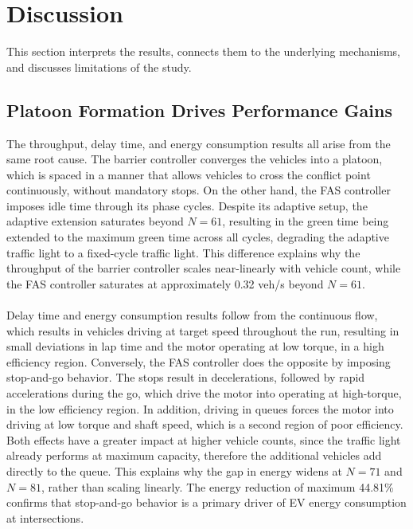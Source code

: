 \section{Discussion}
\label{Discussion}
This section interprets the results, connects them to the underlying mechanisms, and discusses limitations of the study.

\subsection{Platoon Formation Drives Performance Gains}
The throughput, delay time, and energy consumption results all arise from the same root cause. The barrier controller converges the vehicles into a platoon, which is spaced in a manner that allows vehicles to cross the conflict point continuously, without mandatory stops. On the other hand, the FAS controller imposes idle time through its phase cycles. Despite its adaptive setup, the adaptive extension saturates beyond \(N=61\), resulting in the green time being extended to the maximum green time across all cycles, degrading the adaptive traffic light to a fixed-cycle traffic light. This difference explains why the throughput of the barrier controller scales near-linearly with vehicle count, while  the FAS controller saturates at approximately 0.32 veh/s beyond \(N=61\). 
\\\\
Delay time and energy consumption results follow from the continuous flow, which results in vehicles driving at target speed throughout the run, resulting in small deviations in lap time and the motor operating at low torque, in a high efficiency region. Conversely, the FAS controller does the opposite by imposing stop-and-go behavior. The stops result in decelerations, followed by rapid accelerations during the go, which drive the motor into operating at high-torque, in the low efficiency region. In addition, driving in queues forces the motor into driving at low torque and shaft speed, which is a second region of poor efficiency. Both effects have a greater impact at higher vehicle counts, since the traffic light already performs at maximum capacity, therefore the additional vehicles add directly to the queue. This explains why the gap in energy widens at \(N=71\) and \(N=81\), rather than scaling linearly. The energy reduction of maximum 44.81\% confirms that stop-and-go behavior is a primary driver of EV energy consumption at intersections.
\\\\
